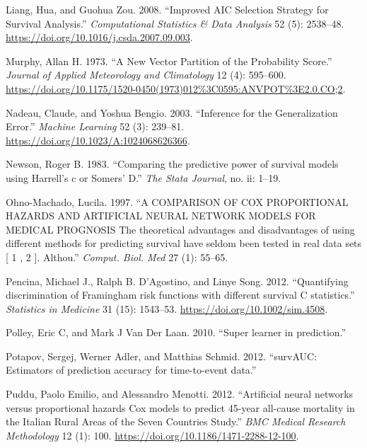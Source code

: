 \documentclass[
  letterpaper,
]{scrbook}
\newlength{\cslhangindent}
\newlength{\cslentryspacingunit} %
\newenvironment{CSLReferences}[2] %
 {%
  \setlength{\parindent}{0pt}
  \ifodd #1
  \let\oldpar\par
  \def\par{\hangindent=\cslhangindent\oldpar}
  \fi
  \setlength{\parskip}{#2\cslentryspacingunit}
 }%
 {}
\theoremstyle{plain}
\theoremstyle{definition}
\theoremstyle{remark}
\begin{document}
\begin{CSLReferences}{1}{0}
\leavevmode{}%
Liang, Hua, and Guohua Zou. 2008. {``{Improved AIC Selection Strategy
for Survival Analysis}.''} \emph{Computational Statistics {\&} Data
Analysis} 52 (5): 2538--48.
\url{https://doi.org/10.1016/j.csda.2007.09.003}.

\leavevmode{}%
Murphy, Allan H. 1973. {``{A New Vector Partition of the Probability
Score}.''} \emph{Journal of Applied Meteorology and Climatology} 12 (4):
595--600.
\url{https://doi.org/10.1175/1520-0450(1973)012\%3C0595:ANVPOT\%3E2.0.CO;2}.

\leavevmode{}%
Nadeau, Claude, and Yoshua Bengio. 2003. {``{Inference for the
Generalization Error}.''} \emph{Machine Learning} 52 (3): 239--81.
\url{https://doi.org/10.1023/A:1024068626366}.

\leavevmode{}%
Newson, Roger B. 1983. {``{Comparing the predictive power of survival
models using Harrell's c or Somers' D}.''} \emph{The Stata Journal}, no.
ii: 1--19.

\leavevmode{}%
Ohno-Machado, Lucila. 1997. {``{A COMPARISON OF COX PROPORTIONAL HAZARDS
AND ARTIFICIAL NEURAL NETWORK MODELS FOR MEDICAL PROGNOSIS The
theoretical advantages and disadvantages of using different methods for
predicting survival have seldom been tested in real data sets {[} 1 , 2
{]}. Althou}.''} \emph{Comput. Biol. Med} 27 (1): 55--65.

\leavevmode{}%
Pencina, Michael J., Ralph B. D'Agostino, and Linye Song. 2012.
{``{Quantifying discrimination of Framingham risk functions with
different survival C statistics}.''} \emph{Statistics in Medicine} 31
(15): 1543--53. \url{https://doi.org/10.1002/sim.4508}.

\leavevmode{}%
Polley, Eric C, and Mark J Van Der Laan. 2010. {``{Super learner in
prediction}.''}

\leavevmode{}%
Potapov, Sergej, Werner Adler, and Matthias Schmid. 2012. {``{survAUC:
Estimators of prediction accuracy for time-to-event data.}''}

\leavevmode{}%
Puddu, Paolo Emilio, and Alessandro Menotti. 2012. {``{Artificial neural
networks versus proportional hazards Cox models to predict 45-year
all-cause mortality in the Italian Rural Areas of the Seven Countries
Study}.''} \emph{BMC Medical Research Methodology} 12 (1): 100.
\url{https://doi.org/10.1186/1471-2288-12-100}.


\end{CSLReferences}
\end{document}
